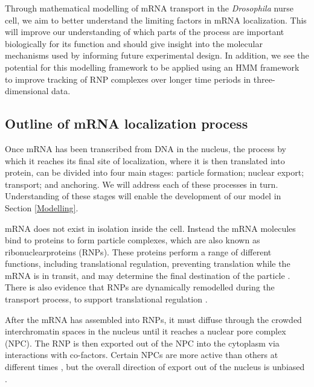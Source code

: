 \documentclass[twocolumn]{biophys}
\begin{document}
Through mathematical modelling of mRNA transport in the \textit{Drosophila} nurse cell, we aim to better understand the limiting factors in mRNA localization.
This will improve our understanding of which parts of the process are important biologically for its function and should give insight into the molecular mechanisms used by informing future experimental design.
In addition, we see the potential for this modelling framework to be applied using an HMM framework to improve tracking of RNP complexes over longer time periods in three-dimensional data.

\subsection{Outline of mRNA localization process} \label{Outline}

Once mRNA has been transcribed from DNA in the nucleus, the process by which it reaches its final site of localization, where it is then translated into protein, can be divided into four main stages: particle formation; nuclear export; transport; and anchoring.
We will address each of these processes in turn.
Understanding of these stages will enable the development of our model in Section \ref{Modelling}.

mRNA does not exist in isolation inside the cell.
Instead the mRNA molecules bind to proteins to form particle complexes, which are also known as ribonuclearproteins (RNPs). 
These proteins perform a range of different functions, including translational regulation, preventing translation while the mRNA is in transit, and may determine the final destination of the particle \citep{hamilton2013multidisciplinary}.
There is also evidence that RNPs are dynamically remodelled during the transport process, to support translational regulation \citep{weil2012drosophila}.

After the mRNA has assembled into RNPs, it must diffuse through the crowded interchromatin spaces in the nucleus until it reaches a nuclear pore complex (NPC).
The RNP is then exported out of the NPC into the cytoplasm via interactions with co-factors.
Certain NPCs are more active than others at different times \citep{weil2012drosophila}, but the overall direction of export out of the nucleus is unbiased \citep{wilkie2001drosophila}. 
\end{document}
